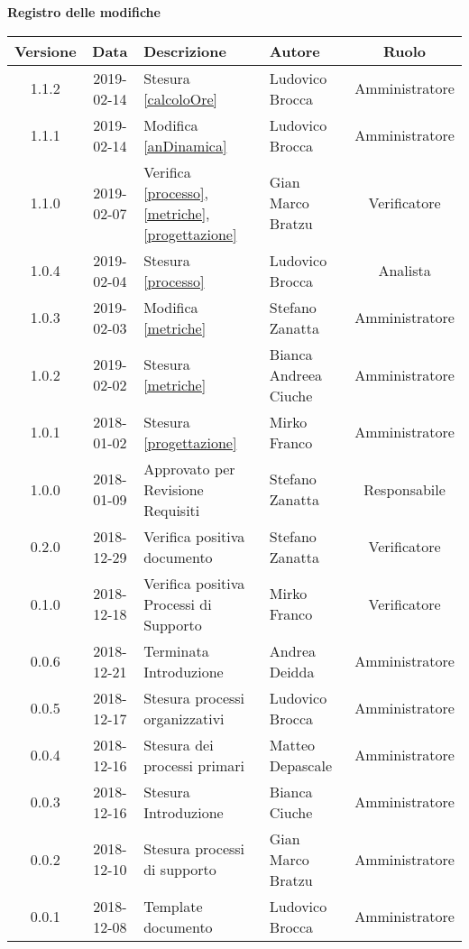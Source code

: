 \begin{center}
	\textbf{Registro delle modifiche}
	\end{center}
	\begin{center}
		\begin{tabularx}{\textwidth}{|c|c|X|X|c|}
			\hline
			\textbf{Versione} & \textbf{Data} & \textbf{Descrizione} & \textbf{Autore} & \textbf{Ruolo} \\
			\hline
			1.1.2 &2019-02-14 &Stesura \ref{calcoloOre} &Ludovico Brocca& Amministratore\\
			\hline
			1.1.1 &2019-02-14 &Modifica \ref{anDinamica} &Ludovico Brocca& Amministratore\\
			\hline
			1.1.0 &2019-02-07 &Verifica \ref{processo}, \ref{metriche}, \ref{progettazione} &Gian Marco Bratzu& Verificatore\\
			\hline
			1.0.4 &2019-02-04&Stesura \ref{processo}&Ludovico Brocca& Analista\\
			\hline
			1.0.3 & 2019-02-03 & Modifica \ref{metriche} & Stefano Zanatta & Amministratore\\
			\hline
			1.0.2 & 2019-02-02 & Stesura \ref{metriche} & Bianca Andreea Ciuche & Amministratore\\
			\hline
			1.0.1 & 2018-01-02 & Stesura \ref{progettazione} & Mirko Franco & Amministratore \\
			\hline
			1.0.0 & 2018-01-09 & Approvato per Revisione Requisiti & Stefano Zanatta & Responsabile\\
			\hline
			0.2.0 & 2018-12-29 & Verifica positiva documento & Stefano Zanatta & Verificatore\\
			\hline
			0.1.0 & 2018-12-18 & Verifica positiva Processi di Supporto & Mirko Franco & Verificatore\\
			\hline
			0.0.6 & 2018-12-21 & Terminata Introduzione & Andrea Deidda & Amministratore\\
			\hline
			0.0.5 & 2018-12-17 & Stesura processi organizzativi & Ludovico Brocca & Amministratore\\
			\hline
			0.0.4 & 2018-12-16 & Stesura dei processi primari & Matteo Depascale & Amministratore\\
			\hline
			0.0.3 & 2018-12-16 & Stesura Introduzione & Bianca Ciuche & Amministratore\\
			\hline
			0.0.2 & 2018-12-10 & Stesura processi di supporto & Gian Marco Bratzu & Amministratore\\	
			\hline
			0.0.1 & 2018-12-08 & Template documento  & Ludovico Brocca & Amministratore\\
			\hline
		\end{tabularx}
	\end{center}

\newpage
